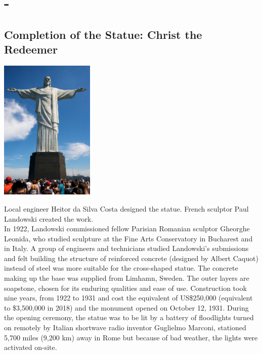 \documentclass[11pt]{report}
\begin{document}
\section{-}
\subsection{Completion of the Statue: Christ the Redeemer}
\vspace{2mm}\begin{center}\includegraphics[width=4.5cm]{./img/christStatue.jpg}\end{center}
Local engineer Heitor da Silva Costa designed the statue. French sculptor Paul Landowski created the work.\\ \indent In 1922, Landowski commissioned fellow Parisian Romanian sculptor Gheorghe Leonida, who studied sculpture at the Fine Arts Conservatory in Bucharest and in Italy.
A group of engineers and technicians studied Landowski's submissions and felt building the structure of reinforced concrete (designed by Albert Caquot) instead of steel was more suitable for the cross-shaped statue. The concrete making up the base was supplied from Limhamn, Sweden. The outer layers are soapstone, chosen for its enduring qualities and ease of use. Construction took nine years, from 1922 to 1931 and cost the equivalent of US\$250,000 (equivalent to \$3,500,000 in 2018) and the monument opened on October 12, 1931. During the opening ceremony, the statue was to be lit by a battery of floodlights turned on remotely by Italian shortwave radio inventor Guglielmo Marconi, stationed 5,700 miles (9,200 km) away in Rome but because of bad weather, the lights were activated on-site.
\end{document}
